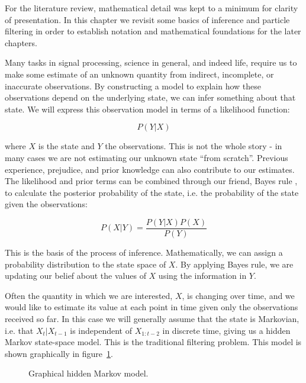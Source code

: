For the literature review, mathematical detail was kept to a minimum for clarity of presentation. In this chapter we revisit some basics of inference and particle filtering in order to establish notation and mathematical foundations for the later chapters.

Many tasks in signal processing, science in general, and indeed life, require us to make some estimate of an unknown quantity from indirect, incomplete, or inaccurate observations. By constructing a model to explain how these observations depend on the underlying state, we can infer something about that state. We will express this observation model in terms of a likelihood function:

\begin{equation}
P(Y|X)
\label{eq:LH}
\end{equation}

where $X$ is the state and $Y$ the observations. This is not the whole story - in many cases we are not estimating our unknown state ``from scratch''. Previous experience, prejudice, and prior knowledge can also contribute to our estimates. The likelihood and prior terms can be combined through our friend, Bayes rule \cite{Bayes1763,Laplace1774}, to calculate the posterior probability of the state, i.e. the probability of the state given the observations:

\begin{equation}
P(X|Y) = \frac{P(Y|X)P(X)}{P(Y)}
\label{eq:BayesRule}
\end{equation}

This is the basis of the process of inference. Mathematically, we can assign a probability distribution to the state space of $X$. By applying Bayes rule, we are updating our belief about the values of $X$ using the information in $Y$.

Often the quantity in which we are interested, $X$, is changing over time, and we would like to estimate its value at each point in time given only the observations received so far. In this case we will generally assume that the state is Markovian, i.e. that $X_t|X_{t-1}$ is independent of $X_{1:t-2}$ in discrete time, giving us a hidden Markov state-space model. This is the traditional filtering problem. This model is shown graphically in figure~\ref{fig:HMM}.

\begin{figure}[hbt]%

\caption{Graphical hidden Markov model.}%
\label{fig:HMM}%
\end{figure}

